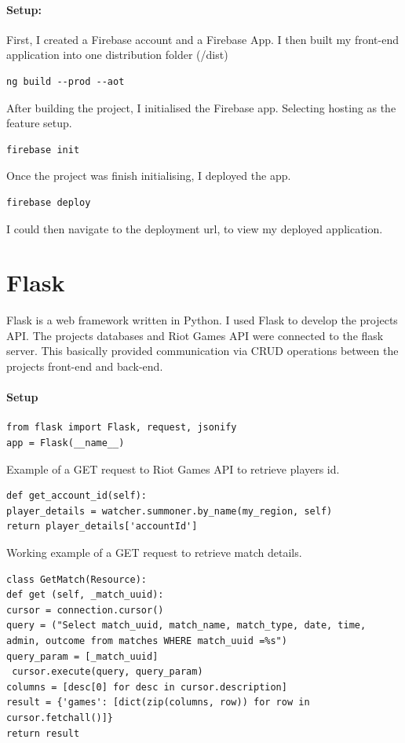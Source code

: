 \paragraph{Setup:}
First, I created a Firebase account and a Firebase App.
I then built my front-end application into one distribution folder (/dist)
\begin{verbatim}
ng build --prod --aot
\end{verbatim}
After building the project, I initialised the Firebase app.
Selecting hosting as the feature setup.
\begin{verbatim}
firebase init
\end{verbatim}
Once the project was finish initialising, I deployed the app.
\begin{verbatim}
firebase deploy
\end{verbatim}
I could then navigate to the deployment url, to view my deployed application.
\section{Flask}
Flask is a web framework written in Python. I used Flask to develop the projects API. The projects databases and Riot Games API were connected to the flask server. This basically provided communication via CRUD operations between the projects front-end and back-end.
\paragraph{Setup}
\begin{verbatim}
from flask import Flask, request, jsonify
app = Flask(__name__)
\end{verbatim}

Example of a GET request to Riot Games API to retrieve players id.
\begin{verbatim}
def get_account_id(self):
player_details = watcher.summoner.by_name(my_region, self)
return player_details['accountId']
\end{verbatim}
\newpage
Working example of a GET request to retrieve match details.
\begin{verbatim}
class GetMatch(Resource):
def get (self, _match_uuid):
cursor = connection.cursor()
query = ("Select match_uuid, match_name, match_type, date, time, admin, outcome from matches WHERE match_uuid =%s")
query_param = [_match_uuid]
 cursor.execute(query, query_param)
columns = [desc[0] for desc in cursor.description]
result = {'games': [dict(zip(columns, row)) for row in cursor.fetchall()]}
return result
\end{verbatim}


